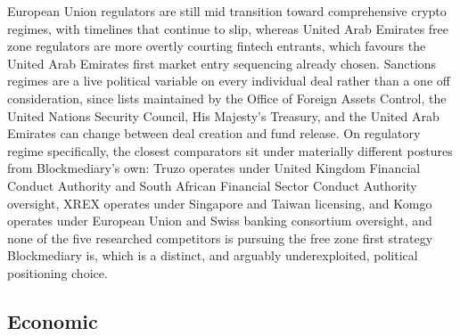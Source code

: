 \documentclass[12pt, a4paper]{article}
\begin{document}
European Union regulators are still mid transition toward comprehensive crypto regimes,
with timelines that continue to slip, whereas United Arab Emirates free zone regulators
are more overtly courting fintech entrants, which favours the United Arab Emirates first
market entry sequencing already chosen. Sanctions regimes are a live political variable on
every individual deal rather than a one off consideration, since lists maintained by the
Office of Foreign Assets Control, the United Nations Security Council, His Majesty's
Treasury, and the United Arab Emirates can change between deal creation and fund release.
On regulatory regime specifically, the closest comparators sit under materially different
postures from Blockmediary's own: Truzo operates under United Kingdom Financial Conduct
Authority and South African Financial Sector Conduct Authority oversight, XREX operates
under Singapore and Taiwan licensing, and Komgo operates under European Union and Swiss
banking consortium oversight, and none of the five researched competitors is pursuing the
free zone first strategy Blockmediary is, which is a distinct, and arguably underexploited,
political positioning choice.

\subsection*{Economic}
\end{document}
